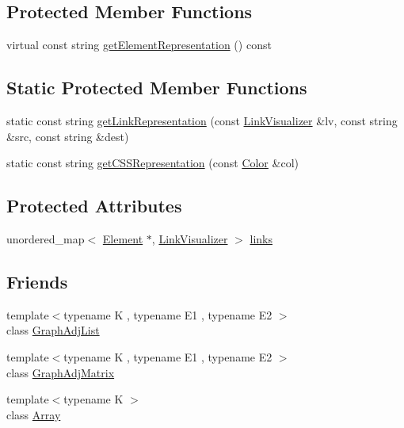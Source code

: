 \subsection*{Protected Member Functions}
\begin{DoxyCompactItemize}
\item 
virtual const string \mbox{\hyperlink{classbridges_1_1_element_abfea1b7226b774be648e15f6b2c9daba}{get\+Element\+Representation}} () const
\end{DoxyCompactItemize}
\subsection*{Static Protected Member Functions}
\begin{DoxyCompactItemize}
\item 
static const string \mbox{\hyperlink{classbridges_1_1_element_ac6fa7b04e28a1e9b8d8f2d395dd6e2c1}{get\+Link\+Representation}} (const \mbox{\hyperlink{classbridges_1_1_link_visualizer}{Link\+Visualizer}} \&lv, const string \&src, const string \&dest)
\item 
static const string \mbox{\hyperlink{classbridges_1_1_element_a513b3409e4b689a390b0dcd50cc2d643}{get\+C\+S\+S\+Representation}} (const \mbox{\hyperlink{classbridges_1_1_color}{Color}} \&col)
\end{DoxyCompactItemize}
\subsection*{Protected Attributes}
\begin{DoxyCompactItemize}
\item 
unordered\+\_\+map$<$ \mbox{\hyperlink{classbridges_1_1_element}{Element}} $\ast$, \mbox{\hyperlink{classbridges_1_1_link_visualizer}{Link\+Visualizer}} $>$ \mbox{\hyperlink{classbridges_1_1_element_a6fb53728edc378f26238543b26238496}{links}}
\end{DoxyCompactItemize}
\subsection*{Friends}
\begin{DoxyCompactItemize}
\item 
{\footnotesize template$<$typename K , typename E1 , typename E2 $>$ }\\class \mbox{\hyperlink{classbridges_1_1_element_a65850138f0763fec43a76fb942f0eccc}{Graph\+Adj\+List}}
\item 
{\footnotesize template$<$typename K , typename E1 , typename E2 $>$ }\\class \mbox{\hyperlink{classbridges_1_1_element_a1935808473b7eb8ff54149c5436c3ac9}{Graph\+Adj\+Matrix}}
\item 
{\footnotesize template$<$typename K $>$ }\\class \mbox{\hyperlink{classbridges_1_1_element_ab1a595168ea1870ce436dfd2d8e69b6d}{Array}}
\end{DoxyCompactItemize}


